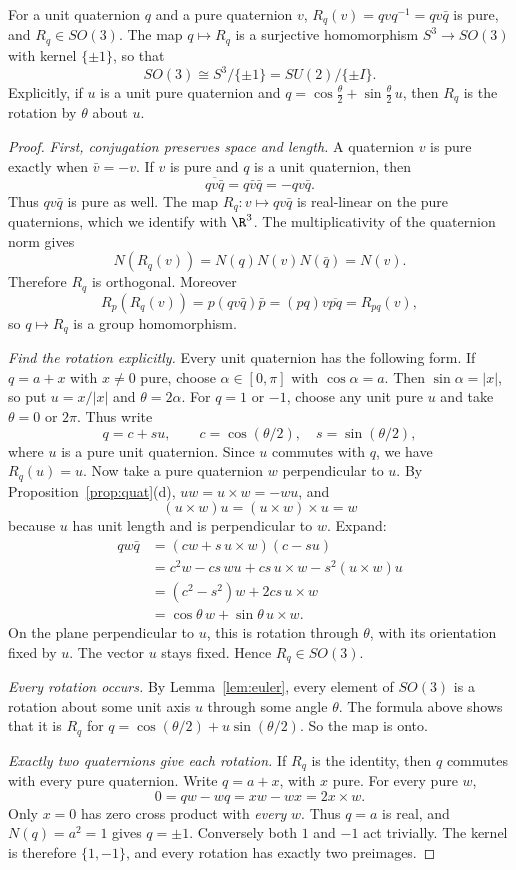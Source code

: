 \begin{theorem}\label{thm:su2so3}
For a unit quaternion $q$ and a pure quaternion $v$, $R_q(v)=qvq^{-1}=qv\bar q$ is pure, and $R_q\in SO(3)$. The map $q\mapsto R_q$ is a surjective homomorphism $S^3\to SO(3)$ with kernel $\{\pm1\}$, so that
\[
SO(3)\cong S^3/\{\pm1\}=SU(2)/\{\pm I\}.
\]
Explicitly, if $u$ is a unit pure quaternion and $q=\cos\frac\theta2+\sin\frac\theta2\,u$, then $R_q$ is the rotation by $\theta$ about $u$.
\end{theorem}
\begin{proof}
\emph{First, conjugation preserves space and length.} A quaternion $v$ is pure exactly when $\bar v=-v$. If $v$ is pure and $q$ is a unit quaternion, then
\[
\overline{qv\bar q}=q\bar v\bar q=-qv\bar q.
\]
Thus $qv\bar q$ is pure as well. The map $R_q:v\mapsto qv\bar q$ is real-linear on the pure quaternions, which we identify with $\R^3$. The multiplicativity of the quaternion norm gives
\[
N(R_q(v))=N(q)N(v)N(\bar q)=N(v).
\]
Therefore $R_q$ is orthogonal. Moreover
\[
R_p(R_q(v))=p(qv\bar q)\bar p=(pq)v\overline{pq}=R_{pq}(v),
\]
so $q\mapsto R_q$ is a group homomorphism.

\emph{Find the rotation explicitly.} Every unit quaternion has the following
form. If $q=a+x$ with $x\ne0$ pure, choose $\alpha\in[0,\pi]$ with
$\cos\alpha=a$. Then $\sin\alpha=|x|$, so put $u=x/|x|$ and $\theta=2\alpha$.
For $q=1$ or $-1$, choose any unit pure $u$ and take $\theta=0$ or $2\pi$.
Thus write
\[
q=c+su,\qquad c=\cos(\theta/2),\quad s=\sin(\theta/2),
\]
where $u$ is a pure unit quaternion. Since $u$ commutes with $q$, we have $R_q(u)=u$. Now take a pure quaternion $w$ perpendicular to $u$. By Proposition~\ref{prop:quat}(d), $uw=u\times w=-wu$, and
\[
(u\times w)u=(u\times w)\times u=w
\]
because $u$ has unit length and is perpendicular to $w$. Expand:
\[
\begin{aligned}
qw\bar q
&=(cw+s\,u\times w)(c-su)\\
&=c^2w-cs\,wu+cs\,u\times w-s^2(u\times w)u\\
&=(c^2-s^2)w+2cs\,u\times w\\
&=\cos\theta\,w+\sin\theta\,u\times w.
\end{aligned}
\]
On the plane perpendicular to $u$, this is rotation through $\theta$, with its orientation fixed by $u$. The vector $u$ stays fixed. Hence $R_q\in SO(3)$.

\emph{Every rotation occurs.} By Lemma~\ref{lem:euler}, every element of $SO(3)$ is a rotation about some unit axis $u$ through some angle $\theta$. The formula above shows that it is $R_q$ for $q=\cos(\theta/2)+u\sin(\theta/2)$. So the map is onto.

\emph{Exactly two quaternions give each rotation.} If $R_q$ is the identity, then $q$ commutes with every pure quaternion. Write $q=a+x$, with $x$ pure. For every pure $w$,
\[
0=qw-wq=xw-wx=2x\times w.
\]
Only $x=0$ has zero cross product with \emph{every} $w$. Thus $q=a$ is real, and $N(q)=a^2=1$ gives $q=\pm1$. Conversely both $1$ and $-1$ act trivially. The kernel is therefore $\{1,-1\}$, and every rotation has exactly two preimages.
\end{proof}

